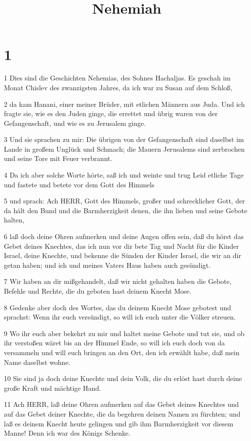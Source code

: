 

\title{Nehemiah}


\chapter{1}

\par 1 Dies sind die Geschichten Nehemias, des Sohnes Hachaljas. Es geschah im Monat Chislev des zwanzigsten Jahres, da ich war zu Susan auf dem Schloß,
\par 2 da kam Hanani, einer meiner Brüder, mit etlichen Männern aus Juda. Und ich fragte sie, wie es den Juden ginge, die errettet und übrig waren von der Gefangenschaft, und wie es zu Jerusalem ginge.
\par 3 Und sie sprachen zu mir: Die übrigen von der Gefangenschaft sind daselbst im Lande in großem Unglück und Schmach; die Mauern Jerusalems sind zerbrochen und seine Tore mit Feuer verbrannt.
\par 4 Da ich aber solche Worte hörte, saß ich und weinte und trug Leid etliche Tage und fastete und betete vor dem Gott des Himmels
\par 5 und sprach: Ach HERR, Gott des Himmels, großer und schrecklicher Gott, der da hält den Bund und die Barmherzigkeit denen, die ihn lieben und seine Gebote halten,
\par 6 laß doch deine Ohren aufmerken und deine Augen offen sein, daß du hörst das Gebet deines Knechtes, das ich nun vor dir bete Tag und Nacht für die Kinder Israel, deine Knechte, und bekenne die Sünden der Kinder Israel, die wir an dir getan haben; und ich und meines Vaters Haus haben auch gesündigt.
\par 7 Wir haben an dir mißgehandelt, daß wir nicht gehalten haben die Gebote, Befehle und Rechte, die du geboten hast deinem Knecht Mose.
\par 8 Gedenke aber doch des Wortes, das du deinem Knecht Mose gebotest und sprachst: Wenn ihr euch versündigt, so will ich euch unter die Völker streuen.
\par 9 Wo ihr euch aber bekehrt zu mir und haltet meine Gebote und tut sie, und ob ihr verstoßen wäret bis an der Himmel Ende, so will ich euch doch von da versammeln und will euch bringen an den Ort, den ich erwählt habe, daß mein Name daselbst wohne.
\par 10 Sie sind ja doch deine Knechte und dein Volk, die du erlöst hast durch deine große Kraft und mächtige Hand.
\par 11 Ach HERR, laß deine Ohren aufmerken auf das Gebet deines Knechtes und auf das Gebet deiner Knechte, die da begehren deinen Namen zu fürchten; und laß es deinem Knecht heute gelingen und gib ihm Barmherzigkeit vor diesem Manne! Denn ich war des Königs Schenke.

